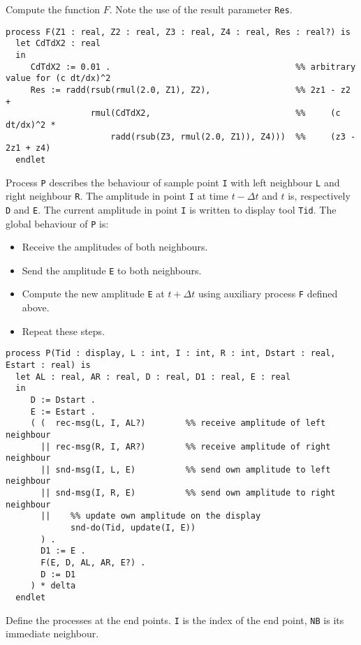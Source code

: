 \noindent
\normalsize
 Compute the function $F$. Note the use of the result parameter {\tt Res}.

\small
\begin{verbatim}
process F(Z1 : real, Z2 : real, Z3 : real, Z4 : real, Res : real?) is
  let CdTdX2 : real
  in
     CdTdX2 := 0.01 .                                     %% arbitrary value for (c dt/dx)^2
     Res := radd(rsub(rmul(2.0, Z1), Z2),                 %% 2z1 - z2 +
                 rmul(CdTdX2,                             %%     (c dt/dx)^2 *
                     radd(rsub(Z3, rmul(2.0, Z1)), Z4)))  %%     (z3 - 2z1 + z4)
  endlet

\end{verbatim}
\noindent
\normalsize
 Process {\tt P} describes the behaviour of sample point {\tt I} with
 left neighbour {\tt L} and right neighbour {\tt R}.
 The amplitude in point {\tt I} at time $t - \Delta t$ and $t$
 is, respectively {\tt D} and {\tt E}.
 The current amplitude in point {\tt I} is written to display tool {\tt Tid}.
 The global behaviour of {\tt P} is:
 \begin{itemize}
 \item Receive the amplitudes of both neighbours.
 \item Send the amplitude {\tt E} to both neighbours.
 \item Compute the new amplitude {\tt E} at $t + \Delta t$ using
 auxiliary process {\tt F} defined above.
 \item Repeat these steps.
 \end{itemize}

\small
\begin{verbatim}
process P(Tid : display, L : int, I : int, R : int, Dstart : real, Estart : real) is
  let AL : real, AR : real, D : real, D1 : real, E : real
  in
     D := Dstart .
     E := Estart .
     ( (  rec-msg(L, I, AL?)        %% receive amplitude of left neighbour
       || rec-msg(R, I, AR?)        %% receive amplitude of right neighbour
       || snd-msg(I, L, E)          %% send own amplitude to left neighbour
       || snd-msg(I, R, E)          %% send own amplitude to right neighbour
       ||    %% update own amplitude on the display
             snd-do(Tid, update(I, E))
       ) .
       D1 := E .
       F(E, D, AL, AR, E?) .
       D := D1
     ) * delta
  endlet

\end{verbatim}
\noindent
\normalsize
 Define the processes at the end points. {\tt I} is the index
 of the end point, {\tt NB} is its immediate neighbour.

